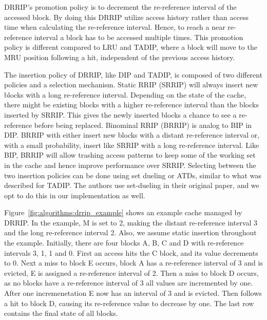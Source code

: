 DRRIP's promotion policy is to decrement the re-reference interval of the accessed block.
By doing this DRRIP utilize access history rather than access time when calculating the re-reference interval.
Hence, to reach a near re-reference interval a block has to be accessed multiple times.
This promotion policy is different compared to LRU and TADIP, where a block will move to the MRU position following a hit, independent of the previous access history.

The insertion policy of DRRIP, like DIP and TADIP, is composed of two different policies and a selection mechanism.
Static RRIP (SRRIP) will always insert new blocks with a long re-reference interval. 
Depending on the state of the cache, there might be existing blocks with a higher re-reference interval than the blocks inserted by SRRIP.
This gives the newly inserted blocks a chance to see a re-reference before being replaced.
Binominal RRIP (BRRIP) is analog to BIP in DIP.
BRRIP with either insert new blocks with a distant re-reference interval or, with a small probability, insert like SRRIP with a long re-reference interval.
Like BIP, BRRIP will allow trashing access patterns to keep some of the working set in the cache and hence improve performance over SRRIP.
Selecting between the two insertion policies can be done using set dueling or ATDs, similar to what was described for TADIP.
The authors use set-dueling in their original paper, and we opt to do this in our implementation as well.

Figure~\ref{fig:algorithms:drrip_example} shows an example cache managed by DRRIP.
In the example, M is set to 2, making the distant re-reference interval 3 and the long re-reference interval 2. 
Also, we assume static insertion throughout the example.
Initially, there are four blocks A, B, C and D with re-reference intervals 3, 1, 1 and 0.
First an access hits the C block, and its value decrements to 0.
Next a miss to block E occurs, block A has a re-reference interval of 3 and is evicted, E is assigned a re-reference interval of 2.
Then a miss to block D occurs, as no blocks have a re-reference interval of 3 all values are incremented by one.
After one incremenetation E now has an interval of 3 and is evicted.
Then follows a hit to block D, causing its re-reference value to decrease by one.
The last row contains the final state of all blocks.